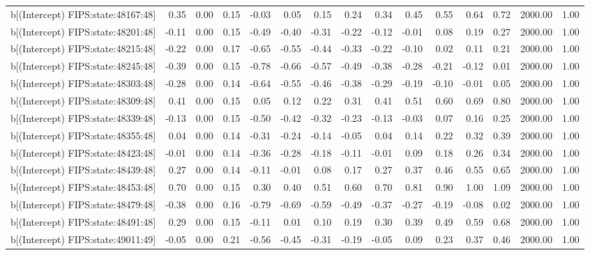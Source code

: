 \begin{table}[ht]
\begin{tabular}{rrrrrrrrrrrrrrr}
  b[(Intercept) FIPS:state:48167:48] & 0.35 & 0.00 & 0.15 & -0.03 & 0.05 & 0.15 & 0.24 & 0.34 & 0.45 & 0.55 & 0.64 & 0.72 & 2000.00 & 1.00 \\ 
  b[(Intercept) FIPS:state:48201:48] & -0.11 & 0.00 & 0.15 & -0.49 & -0.40 & -0.31 & -0.22 & -0.12 & -0.01 & 0.08 & 0.19 & 0.27 & 2000.00 & 1.00 \\ 
  b[(Intercept) FIPS:state:48215:48] & -0.22 & 0.00 & 0.17 & -0.65 & -0.55 & -0.44 & -0.33 & -0.22 & -0.10 & 0.02 & 0.11 & 0.21 & 2000.00 & 1.00 \\ 
  b[(Intercept) FIPS:state:48245:48] & -0.39 & 0.00 & 0.15 & -0.78 & -0.66 & -0.57 & -0.49 & -0.38 & -0.28 & -0.21 & -0.12 & 0.01 & 2000.00 & 1.00 \\ 
  b[(Intercept) FIPS:state:48303:48] & -0.28 & 0.00 & 0.14 & -0.64 & -0.55 & -0.46 & -0.38 & -0.29 & -0.19 & -0.10 & -0.01 & 0.05 & 2000.00 & 1.00 \\ 
  b[(Intercept) FIPS:state:48309:48] & 0.41 & 0.00 & 0.15 & 0.05 & 0.12 & 0.22 & 0.31 & 0.41 & 0.51 & 0.60 & 0.69 & 0.80 & 2000.00 & 1.00 \\ 
  b[(Intercept) FIPS:state:48339:48] & -0.13 & 0.00 & 0.15 & -0.50 & -0.42 & -0.32 & -0.23 & -0.13 & -0.03 & 0.07 & 0.16 & 0.25 & 2000.00 & 1.00 \\ 
  b[(Intercept) FIPS:state:48355:48] & 0.04 & 0.00 & 0.14 & -0.31 & -0.24 & -0.14 & -0.05 & 0.04 & 0.14 & 0.22 & 0.32 & 0.39 & 2000.00 & 1.00 \\ 
  b[(Intercept) FIPS:state:48423:48] & -0.01 & 0.00 & 0.14 & -0.36 & -0.28 & -0.18 & -0.11 & -0.01 & 0.09 & 0.18 & 0.26 & 0.34 & 2000.00 & 1.00 \\ 
  b[(Intercept) FIPS:state:48439:48] & 0.27 & 0.00 & 0.14 & -0.11 & -0.01 & 0.08 & 0.17 & 0.27 & 0.37 & 0.46 & 0.55 & 0.65 & 2000.00 & 1.00 \\ 
  b[(Intercept) FIPS:state:48453:48] & 0.70 & 0.00 & 0.15 & 0.30 & 0.40 & 0.51 & 0.60 & 0.70 & 0.81 & 0.90 & 1.00 & 1.09 & 2000.00 & 1.00 \\ 
  b[(Intercept) FIPS:state:48479:48] & -0.38 & 0.00 & 0.16 & -0.79 & -0.69 & -0.59 & -0.49 & -0.37 & -0.27 & -0.19 & -0.08 & 0.02 & 2000.00 & 1.00 \\ 
  b[(Intercept) FIPS:state:48491:48] & 0.29 & 0.00 & 0.15 & -0.11 & 0.01 & 0.10 & 0.19 & 0.30 & 0.39 & 0.49 & 0.59 & 0.68 & 2000.00 & 1.00 \\ 
  b[(Intercept) FIPS:state:49011:49] & -0.05 & 0.00 & 0.21 & -0.56 & -0.45 & -0.31 & -0.19 & -0.05 & 0.09 & 0.23 & 0.37 & 0.46 & 2000.00 & 1.00 \\ 

\end{tabular}
\end{table}
